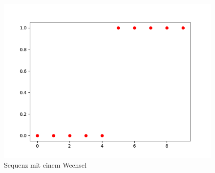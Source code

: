 \begin{figure}
	\centering
		\includegraphics[scale=0.5]{images/Klassifizierung/wechsel}
	\caption{Sequenz mit einem Wechsel}
	\label{fig:wechsel}
\end{figure}